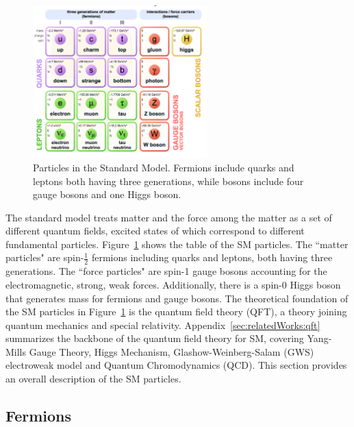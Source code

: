 \begin{figure}[ht]
    \centering
    \includegraphics[width=0.6\textwidth]{chapters/RelatedWorks/sectionSMParticles/figures/sm.png}
    \caption{Particles in the Standard Model. Fermions include quarks and leptons both having three generations, while bosons include four gauge bosons and one Higgs boson.}
    \label{fig:relatedWorks:smParticles:sm}
\end{figure}

The standard model treats matter and the force among the matter as a set of different quantum fields, excited states of which correspond to different fundamental particles. Figure~\ref{fig:relatedWorks:smParticles:sm} shows the table of the SM particles. The ``matter particles" are  spin-$\frac{1}{2}$ fermions including quarks and leptons, both having three generations. The ``force particles" are spin-1 gauge bosons accounting for the electromagnetic, strong, weak forces. Additionally, there is a spin-0 Higgs boson that generates mass for fermions and gauge bosons. The theoretical foundation of the SM particles in Figure~\ref{fig:relatedWorks:smParticles:sm} is the quantum field theory (QFT), a theory joining quantum mechanics and special relativity.  Appendix~\ref{sec:relatedWorks:qft} summarizes the backbone of the quantum field theory for SM, covering Yang-Mills Gauge Theory, Higgs Mechanism, Glashow-Weinberg-Salam (GWS) electroweak model and Quantum Chromodynamics (QCD). This section provides an overall description of the SM particles. 


\subsection{Fermions}
\label{sec:relatedWorks:smParticles:fermion}

